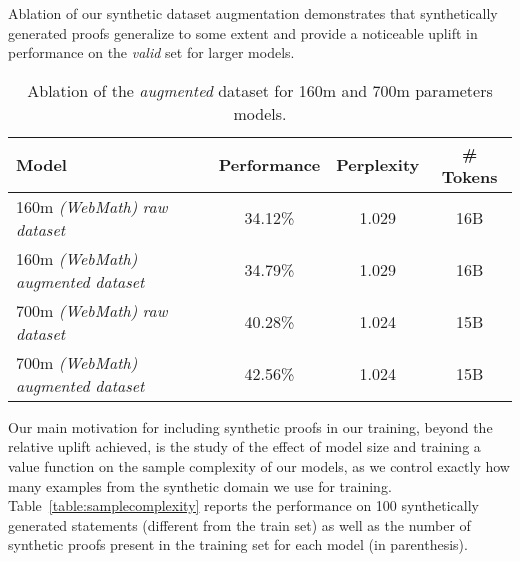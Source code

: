 \documentclass{article}
\begin{document}
Ablation of our synthetic dataset augmentation demonstrates that synthetically generated proofs generalize to some extent and provide a noticeable uplift in performance on the \textit{valid} set for larger models.

\begin{table}[ht]
\caption{Ablation of the \textit{augmented} dataset for 160m and 700m parameters models.} 
\centering
\begin{tabular}{ |l|c|c|c| }
    \hline
    Model & Performance & Perplexity & \# Tokens \\
    \hline
    160m \textit{(WebMath)} \textit{raw dataset} & 34.12\% & 1.029 & 16B \\
    160m \textit{(WebMath)} \textit{augmented dataset} & 34.79\% & 1.029 & 16B \\
    700m \textit{(WebMath)} \textit{raw dataset} & 40.28\% & 1.024 & 15B \\
    700m \textit{(WebMath)} \textit{augmented dataset} & 42.56\% & 1.024 & 15B \\
    \hline
\end{tabular}
\label{table:augmentedabl}
\end{table}

Our main motivation for including synthetic proofs in our training, beyond the relative uplift achieved, is the study of the effect of model size and training a value function on the sample complexity of our models, as we control exactly how many examples from the synthetic domain we use for training. Table~\ref{table:samplecomplexity} reports the performance on 100 synthetically generated statements (different from the train set) as well as the number of synthetic proofs present in the training set for each model (in parenthesis).
\end{document}
